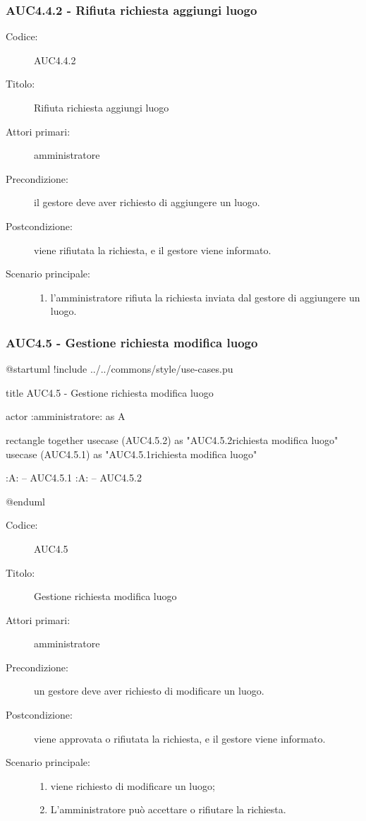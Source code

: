 \documentclass[casi-duso]{subfiles}
\begin{document}
\subsubsection{AUC4.4.2 - Rifiuta richiesta aggiungi luogo}%
\label{subsub:AUC4.4.2}
\begin{description}
  \item[Codice:] AUC4.4.2
  \item[Titolo:] Rifiuta richiesta aggiungi luogo
  \item[Attori primari:] amministratore
  \item[Precondizione:] il gestore deve aver richiesto di aggiungere un luogo.
  \item[Postcondizione:] viene rifiutata la richiesta, e il gestore viene informato.
  \item[Scenario principale:]
  \begin{enumerate}
    \item l'amministratore rifiuta la richiesta inviata dal gestore di aggiungere un luogo.
  \end{enumerate}
\end{description}

\subsubsection{AUC4.5 - Gestione richiesta modifica luogo}%
\label{subsub:AUC4.5}

\begin{plantuml}
@startuml
!include ../../commons/style/use-cases.pu

title AUC4.5 - Gestione richiesta modifica luogo

actor :amministratore: as A

rectangle {
  together {
    usecase (AUC4.5.2) as "AUC4.5.2\nRifiuta richiesta modifica luogo"
    usecase (AUC4.5.1) as "AUC4.5.1\nAccetta richiesta modifica luogo"
  }
}

:A: -- AUC4.5.1
:A: -- AUC4.5.2

@enduml
\end{plantuml}

\begin{description}
  \item[Codice:] AUC4.5
  \item[Titolo:] Gestione richiesta modifica luogo
  \item[Attori primari:] amministratore
  \item[Precondizione:] un gestore deve aver richiesto di modificare un luogo.
  \item[Postcondizione:] viene approvata o rifiutata la richiesta, e il gestore viene informato.
  \item[Scenario principale:]
  \begin{enumerate}
    \item viene richiesto di modificare un luogo;
    \item L'amministratore può accettare o rifiutare la richiesta.
  \end{enumerate}
\end{description}
\end{document}
